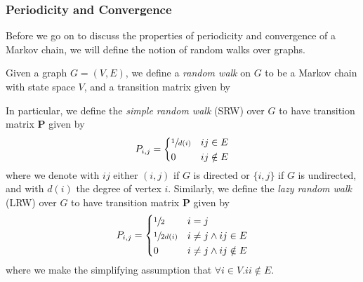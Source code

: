 		\subsubsection{Periodicity and Convergence}
			Before we go on to discuss the properties of periodicity and convergence of a Markov 
			chain, we will define the notion of random walks over graphs.
			\begin{definition}
				Given a graph $G=(V,E)$, we define a \emph{random walk} on $G$ to be a Markov
				chain with state space $V$, and a transition matrix given by
			\end{definition}
			In particular, we define the \emph{simple random walk} (SRW) over $G$ to have 
			transition matrix $\mathbf{P}$ given by 
			$$
				P_{i,j} = 
				\begin{dcases}
					\sfrac{1}{d(i)} & ij \in E \\
					0 & ij \notin E
				\end{dcases}
			$$
			where we denote with $ij$ either $(i,j)$ if $G$ is directed or $\{i,j\}$ if 
			$G$ is undirected, and with $d(i)$ the degree of vertex $i$. Similarly, we define the 
			\emph{lazy random walk} (LRW) over $G$ to have transition matrix $\mathbf{P}$ given
			by 	
			$$
				P_{i,j} = 
				\begin{dcases}
					\sfrac{1}{2} & i = j \\
					\sfrac{1}{2d(i)} & i \neq j \land ij \in E \\
					0 & i \neq j \land ij \notin E
				\end{dcases}
			$$
			where we make the simplifying assumption that $\forall i \in V . ii \notin E$.

